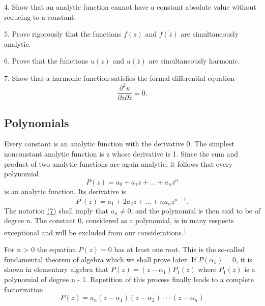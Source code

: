 4. Show that an analytic function cannot have a constant absolute value without reducing to a constant.

5. Prove rigorously that the functions $f(z)$ and $\overline{f(\bar{z})}$ are simultaneously analytic.

6. Prove that the functions $u(z)$ and $u(\bar{z})$ are simultaneously harmonic.

7. Show that a harmonic function satisfies the formal differential equation
\begin{equation*}
\frac {\partial^ {2} u}{\partial z \partial \bar {z}} = 0.
\end{equation*}
\setcounter{section}{1}\setcounter{subsection}{2}\subsection{Polynomials}\label{sec:2.1.3}
Every constant is an analytic function with the derivative 0. The simplest nonconstant analytic function is z whose derivative is 1. Since the sum and product of two analytic functions are again analytic, it follows that every polynomial
\begin{equation*}
P (z) = a _ {0} + a _ {1} z + \dots + a _ {n} z ^ {n}\tag{7}\label{eq:2.7}
\end{equation*}
is an analytic function. Its derivative is
\begin{equation*}
P ^ {\prime} (z) = a _ {1} + 2 a _ {2} z + \dots + n a _ {n} z ^ {n - 1}.
\end{equation*}
The notation \hyperref[eq:2.7]{(7)} shall imply that $a_{n} \neq 0$, and the polynomial is then said to be of degree n. The constant 0, considered as a polynomial, is in many respects exceptional and will be excluded from our considerations.\hyperlink{fn:44:dagger}{\textsuperscript{\ensuremath{\dagger}}}

For n > 0 the equation $P(z) = 0$ has at least one root. This is the so-called fundamental theorem of algebra which we shall prove later. If $P(\alpha_{1}) = 0$, it is shown in elementary algebra that $P(z) = (z - \alpha_{1})P_{1}(z)$ where $P_{1}(z)$ is a polynomial of degree n - 1. Repetition of this process finally leads to a complete factorization
\begin{equation*}
P (z) = a _ {n} \left(z - \alpha_ {1}\right) \left(z - \alpha_ {2}\right) \cdot \cdot \cdot \left(z - \alpha_ {n}\right)\tag{8}\label{eq:2.8}
\end{equation*}
\begingroup\renewcommand{\thefootnote}{}\endgroup

